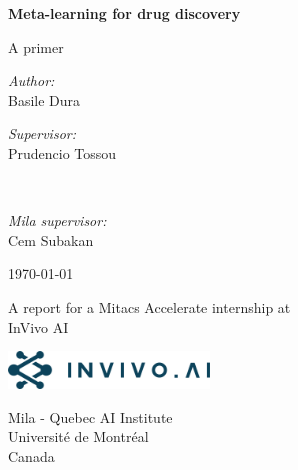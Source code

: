 \documentclass[11pt]{article}
\numberwithin{equation}{subsection}
\begin{document}
\begin{titlepage}
  \begin{center}
    \vspace*{1cm}

    \Huge
    \textbf{Meta-learning for drug discovery}

    \vspace{0.5cm}
    \LARGE
    A primer

    \large

    \vfill
    \vfill

    \emph{Author:} \\
    Basile Dura

    \vfill

    \begin{minipage}{0.4\textwidth}
  		\begin{flushleft} \large
        \emph{Supervisor:} \\
  			Prudencio Tossou
  		\end{flushleft}
  	\end{minipage}~
  	\begin{minipage}{0.4\textwidth}
  		\begin{flushright} \large
        \emph{Mila supervisor:} \\
        Cem Subakan
  		\end{flushright}
  	\end{minipage}



    \vfill

    \today

    \vfill

    A report for a Mitacs Accelerate internship at\\
    InVivo AI

    \vspace{0.2cm}

    \includegraphics[width=0.4\textwidth]{invivo}

    \vspace{0.8cm}

    \Large
    Mila - Quebec AI Institute\\
    Université de Montréal\\
    Canada

  \end{center}
\end{titlepage}
\end{document}
